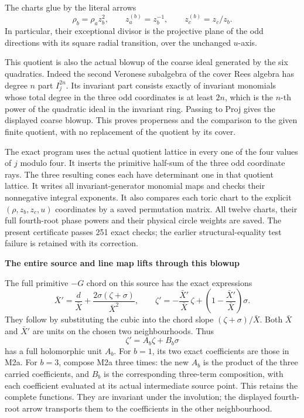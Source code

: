 The charts glue by the literal arrows
\[
 \rho_b=\rho_a z_b^2,\qquad
 z_a^{(b)}=z_b^{-1},\qquad
 z_c^{(b)}=z_c/z_b .
\]
In particular, their exceptional divisor is the projective plane of
the odd directions with its square radial transition, over the
unchanged \(u\)-axis.

This quotient is also the actual blowup of the coarse ideal generated
by the six quadratics. Indeed the second Veronese subalgebra of
the cover Rees algebra has degree \(n\) part \(I_j^{2n}\).
Its invariant part consists exactly of invariant monomials whose total
degree in the three odd coordinates is at least \(2n\), which is the \(n\)-th power of the quadratic
ideal in the invariant ring. Passing to Proj gives the displayed
coarse blowup. This proves properness and the comparison to the given
finite quotient, with no replacement of the quotient by its cover.

The exact program 
uses the actual quotient lattice in every one of the four values of
\(j\) modulo four. It inserts the primitive half-sum of the three odd
coordinate rays. The three resulting cones each have determinant
one in that quotient lattice. It writes all invariant-generator
monomial maps and checks their nonnegative integral exponents.
It also compares each toric chart to the explicit
\((\rho,z_b,z_c,u)\) coordinates by a saved permutation matrix.
All twelve charts, their full fourth-root phase powers and their
physical circle weights are saved. The present certificate passes
251 exact checks; the earlier structural-equality test failure is
retained with its correction.

\par

\medskip\noindent\textbf{The entire source and line map lifts through this blowup}

\par\nobreak

The full primitive \(-G\) chord on this source has the exact expressions
\[
 \bar X'=\frac d{\bar X}
          +\frac{2\sigma(\zeta+\sigma)}{\bar X^2},\qquad
 \zeta'=-\frac{\bar X'}{\bar X}\,\zeta
              +\left(1-\frac{\bar X'}{\bar X}\right)\sigma.     \tag{M2a}
\]
They follow by substituting the cubic into the chord slope
\((\zeta+\sigma)/\bar X\). Both \(\bar X\) and \(\bar X'\) are
units on the chosen two neighbourhoods. Thus
\[
 \zeta'=A_b\zeta+B_b\sigma
\]
has a full holomorphic unit \(A_b\). For \(b=1\), its two exact
coefficients are those in M2a. For \(b=3\), compose M2a three
times: the new \(A_b\) is the product of the three carried
coefficients, and \(B_b\) is the corresponding three-term
composition, with each coefficient evaluated at its actual
intermediate source point. This retains the complete functions.
They are invariant under the involution; the displayed fourth-root
arrow transports them to the coefficients in the other neighbourhood.

